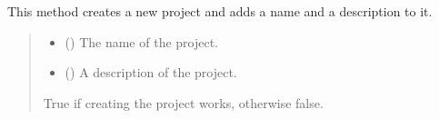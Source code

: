\documentclass[letterpaper,10pt,english]{sphinxmanual}
\begin{document}
\begin{fulllineitems}
\begin{fulllineitems}
\begin{quote}
\begin{description}
\begin{itemize}
\end{itemize}

\end{description}\end{quote}

\end{fulllineitems}


\begin{fulllineitems}
\label{\detokenize{apidoc/src.osm_configurator.model.project:src.osm_configurator.model.project.active_project.ActiveProject.create}}
\pysigstartsignatures
{}
\pysigstopsignatures
\sphinxAtStartPar
This method creates a new project and adds a name and a description to it.
\begin{quote}\begin{description}
\begin{itemize}
\item {} 
\sphinxAtStartPar
{} () \textendash{} The name of the project.

\item {} 
\sphinxAtStartPar
{} () \textendash{} A description of the project.

\end{itemize}

\sphinxAtStartPar
True if creating the project works, otherwise false.

\sphinxAtStartPar
{}

\end{description}\end{quote}

\end{fulllineitems}



\end{fulllineitems}
\end{document}
